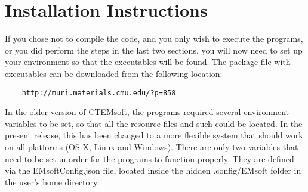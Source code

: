 \documentclass[DIV=calc, paper=letter, fontsize=11pt]{scrartcl}	 %
\begin{document}
\section{Installation Instructions\label{sec:todo}}
If you chose not to compile the code, and you only wish to execute the programs, or you did perform the steps in the last two sections, you will
now need to set up your environment so that the executables will be found.  The package file with executables can be downloaded from the following
location:
\begin{verbatim}
	http://muri.materials.cmu.edu/?p=858
\end{verbatim}
In the older version of CTEMsoft, the programs required several environment variables to be set, so
that all the resource files and such could be located. In the present release, this has been changed
to a more flexible system that should work on all platforms (OS X, Linux and Windows).  There are 
only two variables that need to be set in order for the programs to function properly.  They are defined 
via the \textsf{EMsoftConfig.json} file, located inside the hidden \textsf{.config/EMsoft} folder in the user's 
home directory.
\end{document}
